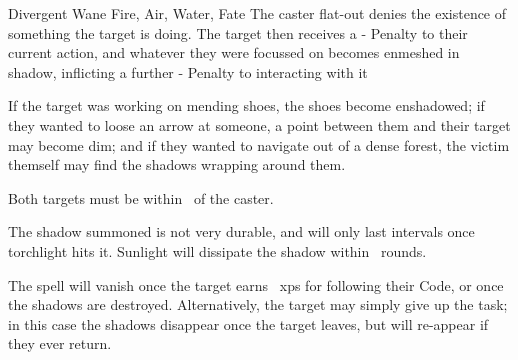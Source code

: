   {Divergent}%
  {Wane}%
  {Fire, Air, Water, Fate}%
  {}%
  {The caster flat-out denies the existence of something the target is doing.
  The target then receives a - Penalty to their current action, and whatever they were focussed on becomes enmeshed in shadow, inflicting a further - Penalty to interacting with it}%
  {If the target was working on mending shoes, the shoes become enshadowed; if they wanted to loose an arrow at someone, a point between them and their target may become dim; and if they wanted to navigate out of a dense forest, the victim themself may find the shadows wrapping around them.

	Both targets must be within \spellRange\ of the caster.

	The shadow summoned is not very durable, and will only last  \glspl{interval} once torchlight hits it.
	Sunlight will dissipate the shadow within ~\glspl{round}.

  The spell will vanish once the target earns ~\glspl{xp} for following their Code, or once the shadows are destroyed.
  Alternatively, the target may simply give up the task; in this case the shadows disappear once the target leaves, but will re-appear if they ever return.
  }

